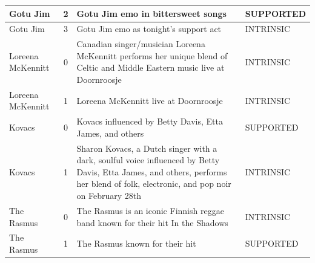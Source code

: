\begin{center}
\begin{longtable}{p{3cm}cp{7cm}p{3cm}}
\midrule
Gotu Jim & 2 & Gotu Jim emo in bittersweet songs & SUPPORTED \\
\midrule
Gotu Jim & 3 & Gotu Jim emo as tonight's support act & INTRINSIC \\
\midrule
Loreena McKennitt & 0 & Canadian singer/musician Loreena McKennitt performs her unique blend of Celtic and Middle Eastern music live at Doornroosje & INTRINSIC \\
\midrule
Loreena McKennitt & 1 & Loreena McKennitt live at Doornroosje & INTRINSIC \\
\midrule
Kovacs & 0 & Kovacs influenced by Betty Davis, Etta James, and others & SUPPORTED \\
\midrule
Kovacs & 1 & Sharon Kovacs, a Dutch singer with a dark, soulful voice influenced by Betty Davis, Etta James, and others, performs her blend of folk, electronic, and pop noir on February 28th & INTRINSIC \\
\midrule
The Rasmus & 0 & The Rasmus is an iconic Finnish reggae band known for their hit In the Shadows & INTRINSIC \\
\midrule
The Rasmus & 1 & The Rasmus known for their hit & SUPPORTED \\
\bottomrule
\end{longtable}
\end{center}